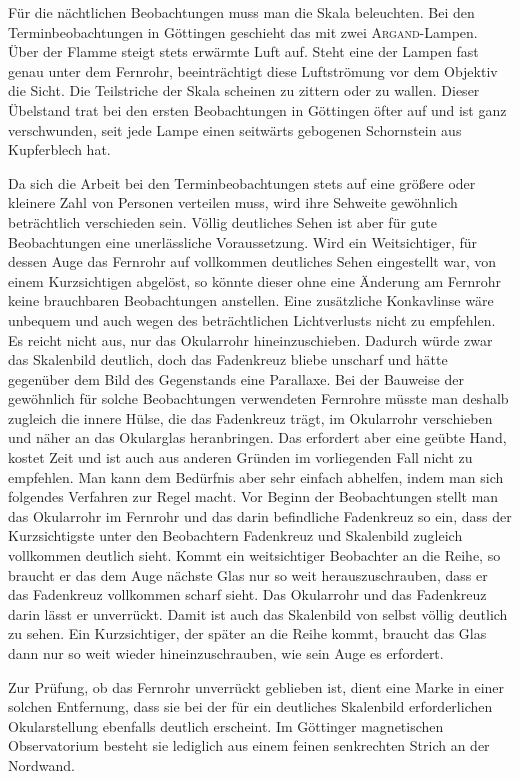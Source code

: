 Für die nächtlichen Beobachtungen muss man die Skala beleuchten. Bei den Terminbeobachtungen in Göttingen geschieht das mit zwei \textsc{Argand}-Lampen. Über der Flamme steigt stets erwärmte Luft auf. Steht eine der Lampen fast genau unter dem Fernrohr, beeinträchtigt diese Luftströmung vor dem Objektiv die Sicht. Die Teilstriche der Skala scheinen zu zittern oder zu wallen. Dieser Übelstand trat bei den ersten Beobachtungen in Göttingen öfter auf und ist ganz verschwunden, seit jede Lampe einen seitwärts gebogenen Schornstein aus Kupferblech hat.

Da sich die Arbeit bei den Terminbeobachtungen stets auf eine größere oder kleinere Zahl von Personen verteilen muss, wird ihre Sehweite gewöhnlich beträchtlich verschieden sein. Völlig deutliches Sehen ist aber für gute Beobachtungen eine unerlässliche Voraussetzung. Wird ein Weitsichtiger, für dessen Auge das Fernrohr auf vollkommen deutliches Sehen eingestellt war, von einem Kurzsichtigen abgelöst, so könnte dieser ohne eine Änderung am Fernrohr keine brauchbaren Beobachtungen
anstellen. Eine zusätzliche Konkavlinse wäre unbequem und auch wegen des beträchtlichen Lichtverlusts nicht zu empfehlen. Es reicht nicht aus, nur das Okularrohr hineinzuschieben. Dadurch würde zwar das Skalenbild deutlich, doch das Fadenkreuz bliebe unscharf und hätte gegenüber dem Bild des Gegenstands eine Parallaxe. Bei der Bauweise der gewöhnlich für solche Beobachtungen verwendeten Fernrohre müsste man deshalb zugleich die innere Hülse, die das Fadenkreuz trägt, im Okularrohr verschieben und näher an das Okularglas heranbringen. Das erfordert aber eine geübte Hand, kostet Zeit und ist auch aus anderen Gründen im vorliegenden Fall nicht zu empfehlen. Man kann dem Bedürfnis aber sehr einfach abhelfen, indem man sich folgendes Verfahren zur Regel macht. Vor Beginn der Beobachtungen stellt man das Okularrohr im Fernrohr und das darin befindliche Fadenkreuz so ein, dass der Kurzsichtigste unter den Beobachtern Fadenkreuz und Skalenbild zugleich vollkommen deutlich sieht. Kommt ein weitsichtiger Beobachter an die Reihe, so braucht er das dem Auge nächste Glas nur so weit herauszuschrauben, dass er das Fadenkreuz vollkommen scharf sieht. Das Okularrohr und das Fadenkreuz darin lässt er unverrückt. Damit ist auch das Skalenbild von selbst völlig deutlich zu sehen. Ein Kurzsichtiger, der später an die Reihe kommt, braucht das Glas dann nur so weit wieder hineinzuschrauben, wie sein Auge es erfordert.

Zur Prüfung, ob das Fernrohr unverrückt geblieben ist, dient eine Marke in einer solchen Entfernung, dass sie bei der für ein deutliches Skalenbild erforderlichen Okularstellung ebenfalls deutlich erscheint. Im Göttinger magnetischen Observatorium besteht sie lediglich aus einem feinen senkrechten Strich an der Nordwand.

